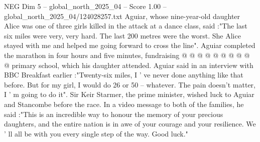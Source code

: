 \begin{textsample}{NEG Dim 5 – global\_north\_2025\_04 – Score 1.00 – global\_north\_2025\_04/124028257.txt}
Aguiar, whose nine-year-old daughter Alice was one of three girls killed in the attack at a dance class, said :"The last six miles were very, very hard.
The last 200 metres were the worst.
She Alice stayed with me and helped me going forward to cross the line".
Aguiar completed the marathon in four hours and five minutes, fundraising @ @ @ @ @ @ @ @ @ @ primary school, which his daughter attended.
Aguiar said in an interview with BBC Breakfast earlier :"Twenty-six miles, I ' ve never done anything like that before.
But for my girl, I would do 26 or 50 -- whatever.
The pain doesn't matter, I ' m going to do it".
Sir Keir Starmer, the prime minister, wished luck to Aguiar and Stancombe before the race.
In a video message to both of the families, he said :"This is an incredible way to honour the memory of your precious daughters, and the entire nation is in awe of your courage and your resilience.
We ' ll all be with you every single step of the way.
Good luck."

\end{textsample}
